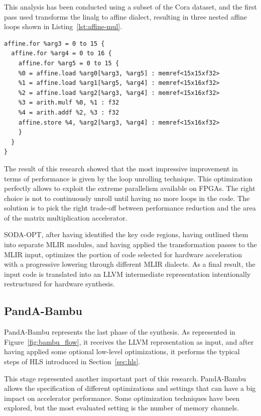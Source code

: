 This analysis has been conducted using a subset of the Cora dataset, and the first pass used transforms the linalg to affine dialect, resulting in three nested affine loops shown in Listing~\ref{lst:affine-mul}.

\begin{lstlisting}[label={lst:affine-mul}, caption=Matrix multiplication in MLIR affine dialect]
affine.for %arg3 = 0 to 15 {
  affine.for %arg4 = 0 to 16 {
    affine.for %arg5 = 0 to 15 {
    %0 = affine.load %arg0[%arg3, %arg5] : memref<15x15xf32>
    %1 = affine.load %arg1[%arg5, %arg4] : memref<15x16xf32>
    %2 = affine.load %arg2[%arg3, %arg4] : memref<15x16xf32>
    %3 = arith.mulf %0, %1 : f32
    %4 = arith.addf %2, %3 : f32
    affine.store %4, %arg2[%arg3, %arg4] : memref<15x16xf32>
    }
  }
}
\end{lstlisting}

The result of this research showed that the most impressive improvement in terms of performance is given by the loop unrolling technique.
This optimization perfectly allows to exploit the extreme parallelism available on FPGAs.
The right choice is not to continuously unroll until having no more loops in the code.
The solution is to pick the right trade-off between performance reduction and the area of the matrix multiplication accelerator.

SODA-OPT, after having identified the key code regions, having outlined them into separate MLIR modules, and having applied the transformation passes to the MLIR input, optimizes the portion of code selected for hardware acceleration with a progressive lowering through different MLIR dialects.
As a final result, the input code is translated into an LLVM intermediate representation intentionally restructured for hardware synthesis.

\subsection{PandA-Bambu}
\label{subsec:toolchain-panda_bambu}%

PandA-Bambu represents the last phase of the synthesis.
As represented in Figure~\ref{fig:bambu_flow}, it receives the LLVM representation as input, and after having applied some optional low-level optimizations, it performs the typical steps of HLS introduced in Section~\ref{sec:hls}.

This stage represented another important part of this research.
PandA-Bambu allows the specification of different optimizations and settings that can have a big impact on accelerator performance.
Some optimization techniques have been explored, but the most evaluated setting is the number of memory channels.

